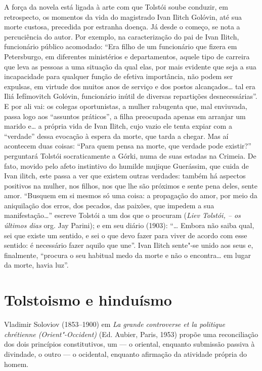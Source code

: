 A força da novela está ligada à arte com que
Tolstói soube conduzir, em retrospecto, os momentos da vida do
magistrado Ivan Ilitch Golóvin, até sua morte custosa, precedida por
estranha doença. Já desde o começo, se nota a percuciência do autor. Por
exemplo, na caracterização do pai de Ivan Ilitch, funcionário público
acomodado: ``Era filho de um funcionário que fizera em Petersburgo, em
diferentes ministérios e departamentos, aquele tipo de carreira que leva
as pessoas a uma situação da qual elas, por mais evidente que seja a sua
incapacidade para qualquer função de efetiva importância, não podem ser
expulsas, em virtude dos muitos anos de serviço e dos postos
alcançados\ldots{} tal era Iliá Iefímovitch Golóvin, funcionário inútil de
diversas repartições desnecessárias''. E por ali vai: os colegas
oportunistas, a mulher rabugenta que, mal enviuvada, passa logo aos ``assuntos práticos'', a filha preocupada apenas em arranjar um marido
e\ldots{} a própria vida de Ivan Ilitch, cujo vazio ele tenta expiar com a ``verdade'' dessa evocação à espera da morte, que tarda a chegar. Mas aí
acontecem duas coisas: ``Para quem pensa na morte, que verdade pode
existir?'' perguntará Tolstói socraticamente a Górki, numa de suas
estadas na Crimeia. De fato, movido pelo afeto instintivo do humilde
mujique Guerássim, que cuida de Ivan ilitch, este passa a ver que
existem outras verdades: também há aspectos positivos na mulher, nos
filhos, nos que lhe são próximos e sente pena deles, sente amor.
``Busquem em si mesmos só uma coisa: a propagação do amor, por meio da
aniquilação dos erros, dos pecados, das paixões, que impedem a sua
manifestação\ldots{}'' escreve Tolstói a um dos que o procuram (\emph{Liev
Tolstói, -- os últimos dias} org. Jay Parini); e em seu diário (1903): ``\ldots{} Embora não saiba qual, sei que existe um sentido, e sei o que devo
fazer para viver de acordo com esse sentido: é necessário fazer aquilo
que une''. Ivan Ilitch sente"-se unido aos seus e, finalmente, ``procura
o seu habitual medo da morte e não o encontra\ldots{} em lugar da morte,
havia luz''.

\chapter{Tolstoismo e hinduísmo}

Vladimir Soloviov (1853--1900) em \emph{La grande controverse et la
politique chrétienne (Orient"-Occident)} (Ed. Aubier, Paris, 1953)
propõe uma reconciliação dos dois princípios constitutivos, um --- o
oriental, enquanto submissão passiva à divindade, o outro --- o
ocidental, enquanto afirmação da atividade própria do homem.

